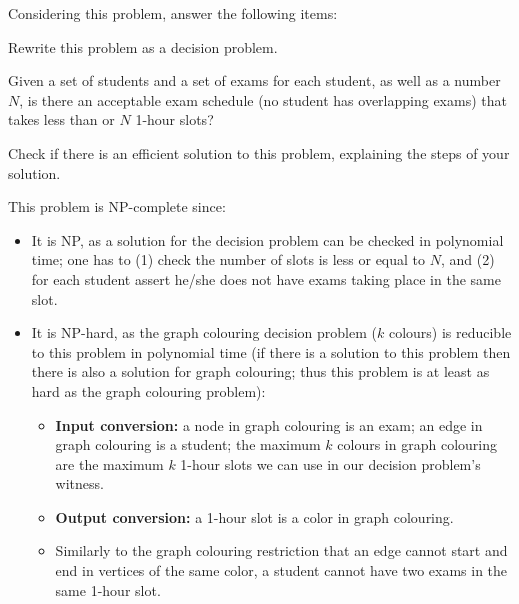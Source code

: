 {Considering this problem, answer the following items:

Rewrite this problem as a decision problem.

\ansseparator

Given a set of students and a set of exams for each student, as well as a number $N$, is there an acceptable exam schedule (no student has overlapping exams) that takes less than or $N$ 1-hour slots?

Check if there is an efficient solution to this problem, explaining the steps of your solution.

\ansseparator

This problem is NP-complete since:
\begin{itemize}
    \item It is NP, as a solution for the decision problem can be checked in polynomial time; one has to (1) check the number of slots is less or equal to $N$, and (2) for each student assert he/she does not have exams taking place in the same slot.
    \item It is NP-hard, as the graph colouring decision problem ($k$ colours) is reducible to this problem in polynomial time (if there is a solution to this problem then there is also a solution for graph colouring; thus this problem is at least as hard as the graph colouring problem):
    \begin{itemize}
        \item \textbf{Input conversion:} a node in graph colouring is an exam; an edge in graph colouring is a student; the maximum $k$ colours in graph colouring are the maximum $k$ 1-hour slots we can use in our decision problem's witness.
        \item \textbf{Output conversion:} a 1-hour slot is a color in graph colouring.
        \item Similarly to the graph colouring restriction that an edge cannot start and end in vertices of the same color, a student cannot have two exams in the same 1-hour slot.
    \end{itemize}
\end{itemize}


}
